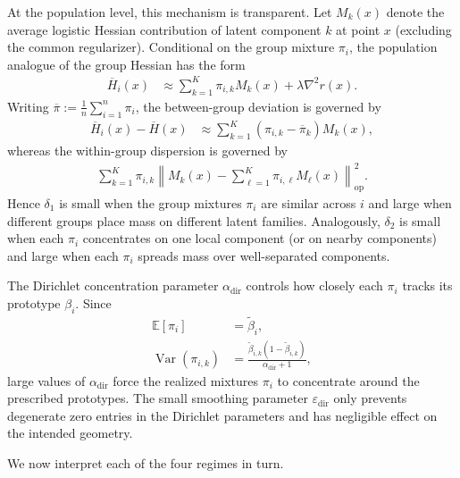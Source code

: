\documentclass{article}
\newcommand{\op}{\operatorname{op}}
\newcommand{\opnorm}[1]{\left\| #1 \right\|_{\op}}      %
\newcommand{\eqdef}{:=}
\theoremstyle{plain}
\begin{document}
At the population level, this mechanism is transparent. Let $M_k(x)$ denote the average logistic Hessian contribution of latent component $k$ at point $x$ (excluding the common regularizer). Conditional on the group mixture $\pi_i$, the population analogue of the group Hessian has the form
\begin{align*}
    \overline H_i(x)
    &\approx
    \sum_{k=1}^K \pi_{i,k} M_k(x)
    +
    \lambda\nabla^2 r(x).
\end{align*}
Writing $\overline\pi\eqdef \frac1n\sum_{i=1}^n \pi_i$, the between-group deviation is governed by
\begin{align*}
    \overline H_i(x)-\overline H(x)
    &\approx
    \sum_{k=1}^K
    (\pi_{i,k}-\overline\pi_k)M_k(x),
\end{align*}
whereas the within-group dispersion is governed by
\begin{align*}
    \sum_{k=1}^K \pi_{i,k}
    \opnorm{
    M_k(x)-\sum_{\ell=1}^K \pi_{i,\ell}M_\ell(x)
    }^2 .
\end{align*}
Hence $\delta_1$ is small when the group mixtures $\pi_i$ are similar across $i$ and large when different groups place mass on different latent families. Analogously, $\delta_2$ is small when each $\pi_i$ concentrates on one local component (or on nearby components) and large when each $\pi_i$ spreads mass over well-separated components.

The Dirichlet concentration parameter $\alpha_{\mathrm{dir}}$ controls how closely each $\pi_i$ tracks its prototype $\beta_i$. Since
\begin{align*}
    \mathbb{E}[\pi_i] &= \widetilde\beta_i,\\
    \operatorname{Var}(\pi_{i,k})
    &=
    \frac{\widetilde\beta_{i,k}(1-\widetilde\beta_{i,k})}
    {\alpha_{\mathrm{dir}}+1},
\end{align*}
large values of $\alpha_{\mathrm{dir}}$ force the realized mixtures $\pi_i$ to concentrate around the prescribed prototypes. The small smoothing parameter $\varepsilon_{\mathrm{dir}}$ only prevents degenerate zero entries in the Dirichlet parameters and has negligible effect on the intended geometry.

We now interpret each of the four regimes in turn.
\end{document}
